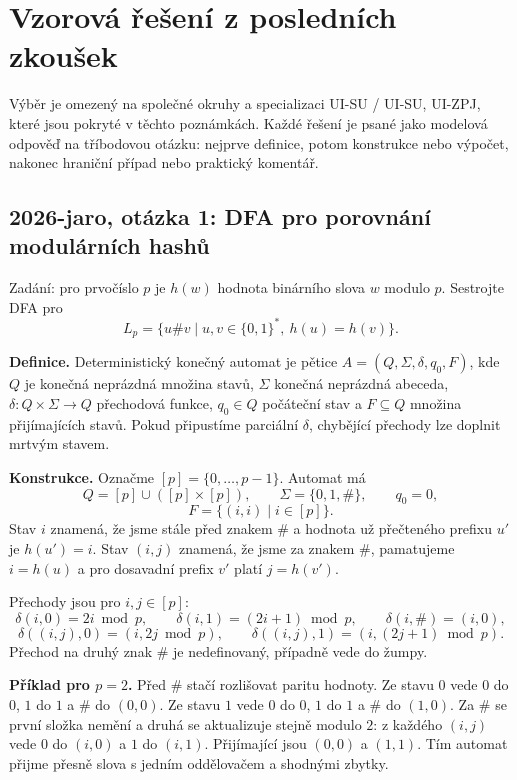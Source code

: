 \section{Vzorová řešení z posledních zkoušek}

{\small Výběr je omezený na společné okruhy a specializaci UI-SU / UI-SU, UI-ZPJ, které jsou
pokryté v těchto poznámkách. Každé řešení je psané jako modelová odpověď na tříbodovou otázku:
nejprve definice, potom konstrukce nebo výpočet, nakonec hraniční případ nebo praktický komentář.}

\subsection{2026-jaro, otázka 1: DFA pro porovnání modulárních hashů}

Zadání: pro prvočíslo $p$ je $h(w)$ hodnota binárního slova $w$ modulo $p$. Sestrojte DFA pro
\[
L_p=\{u\#v\mid u,v\in\{0,1\}^*,\ h(u)=h(v)\}.
\]

\begin{odpoved}
\textbf{Definice.} Deterministický konečný automat je pětice
$A=(Q,\Sigma,\delta,q_0,F)$, kde $Q$ je konečná neprázdná množina stavů,
$\Sigma$ konečná neprázdná abeceda, $\delta:Q\times\Sigma\to Q$ přechodová funkce,
$q_0\in Q$ počáteční stav a $F\subseteq Q$ množina přijímajících stavů. Pokud připustíme
parciální $\delta$, chybějící přechody lze doplnit mrtvým stavem.

\textbf{Konstrukce.} Označme $[p]=\{0,\ldots,p-1\}$. Automat má
\[
Q=[p]\cup([p]\times[p]),\qquad \Sigma=\{0,1,\#\},\qquad q_0=0,
\]
\[
F=\{(i,i)\mid i\in[p]\}.
\]
Stav $i$ znamená, že jsme stále před znakem $\#$ a hodnota už přečteného prefixu $u'$ je
$h(u')=i$. Stav $(i,j)$ znamená, že jsme za znakem $\#$, pamatujeme $i=h(u)$ a pro dosavadní
prefix $v'$ platí $j=h(v')$.

Přechody jsou pro $i,j\in[p]$:
\[
\delta(i,0)=2i\bmod p,\qquad
\delta(i,1)=(2i+1)\bmod p,\qquad
\delta(i,\#)=(i,0),
\]
\[
\delta((i,j),0)=(i,2j\bmod p),\qquad
\delta((i,j),1)=(i,(2j+1)\bmod p).
\]
Přechod na druhý znak $\#$ je nedefinovaný, případně vede do žumpy.

\textbf{Příklad pro $p=2$.} Před $\#$ stačí rozlišovat paritu hodnoty. Ze stavu $0$ vede $0$ do
$0$, $1$ do $1$ a $\#$ do $(0,0)$. Ze stavu $1$ vede $0$ do $0$, $1$ do $1$ a $\#$ do $(1,0)$.
Za $\#$ se první složka nemění a druhá se aktualizuje stejně modulo $2$:
z každého $(i,j)$ vede $0$ do $(i,0)$ a $1$ do $(i,1)$. Přijímající jsou $(0,0)$ a $(1,1)$.
Tím automat přijme přesně slova s jedním oddělovačem a shodnými zbytky.
\end{odpoved}

